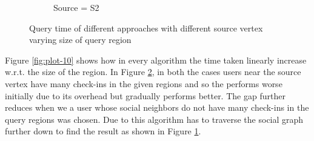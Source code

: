 \begin{figure}[t]
\begin{subfigure}[t]{0.23\textwidth}
		\caption{Source = S2}
		\label{fig:plot-11}
	\end{subfigure}
	\caption{Query time of different {\rrp} approaches with different source vertex varying size of query region}
	\label{fig:plot1011}
\end{figure}

Figure \ref{fig:plot-10} shows how in every algorithm the time taken linearly increase w.r.t. the size of the region. In Figure \ref{fig:plot1011}, in both the cases users near the source vertex have many check-ins in the given regions and so the {\rrpspatial} performs worse initially due to its overhead but gradually performs better. The gap further reduces when we a user whose social neighbors do not have many check-ins in the query regions was chosen. Due to this algorithm has to traverse the social graph further down to find the result as shown in Figure \ref{fig:plot-11}.
